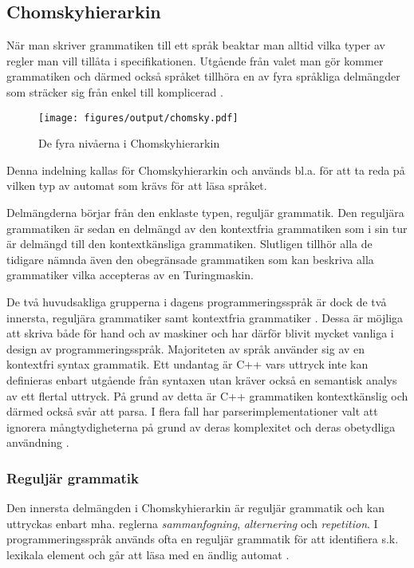 \subsection{Chomskyhierarkin}

När man skriver grammatiken till ett språk beaktar man alltid vilka
typer av regler man vill tillåta i specifikationen. Utgående från valet man
gör kommer grammatiken och därmed också språket tillhöra en av fyra språkliga
delmängder som sträcker sig från enkel till komplicerad \citep[s. 19]{gd08}.

\begin{figure}[ht]
  \texttt{[image: figures/output/chomsky.pdf]}
  \caption{De fyra nivåerna i Chomskyhierarkin}
\end{figure}

Denna indelning kallas för Chomskyhierarkin och används bl.a. för att ta reda
på vilken typ av automat som krävs för att läsa språket.

Delmängderna börjar från den enklaste typen, reguljär grammatik. Den
reguljära grammatiken är sedan en delmängd av den kontextfria grammatiken som i
sin tur är delmängd till den kontextkänsliga grammatiken. Slutligen tillhör
alla de tidigare nämnda även den obegränsade grammatiken som kan
beskriva alla grammatiker vilka accepteras av en Turingmaskin.

De två huvudsakliga grupperna i dagens programmeringsspråk är dock de två
innersta, reguljära grammatiker samt kontextfria grammatiker \citep[s.
100]{sm09}. Dessa är möjliga att skriva både för hand och av maskiner och har
därför blivit mycket vanliga i design av programmeringsspråk. Majoriteten av
språk använder sig av en kontextfri syntax grammatik. Ett undantag är C++ vars
uttryck inte kan definieras enbart utgående från syntaxen utan kräver också en
semantisk analys av ett flertal uttryck. På grund av detta är C++ grammatiken
kontextkänslig och därmed också svår att parsa. I flera fall har
parserimplementationer valt att ignorera mångtydigheterna på grund av deras
komplexitet och deras obetydliga användning \citep[s. 2]{rt05}.

\subsubsection{Reguljär grammatik}

Den innersta delmängden i Chomskyhierarkin är reguljär grammatik och kan uttryckas
enbart mha. reglerna \textit{sammanfogning}, \textit{alternering} och
\textit{repetition}. I programmeringsspråk används ofta en reguljär grammatik
för att identifiera s.k. lexikala element och går att läsa med en ändlig
automat \citep[s. 100]{sm09}.

